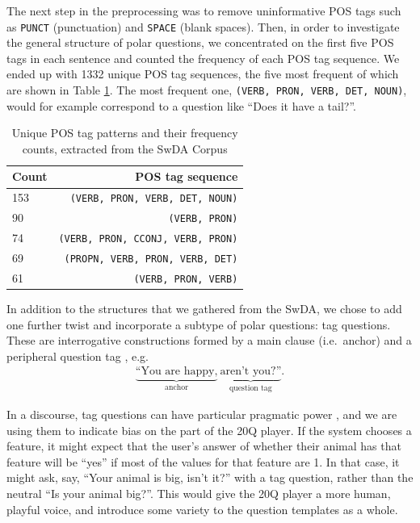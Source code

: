 \documentclass[11pt,a4paper]{article}
\begin{document}
The next step in the preprocessing was to remove uninformative POS tags such as \texttt{PUNCT} (punctuation) and \texttt{SPACE} (blank spaces).
Then, in order to investigate the general structure of polar questions, we concentrated on the first five POS tags in each sentence and counted the frequency of each POS tag sequence.
We ended up with 1332 unique POS tag sequences, the five most frequent of which are shown in Table \ref{tab:pos_patterns}.
The most frequent one, \texttt{(VERB, PRON, VERB, DET, NOUN)}, would for example correspond to a question like ``Does it have a tail?''.

\begin{table}
\centering
{\small
\begin{tabular}{lr}
	\toprule
	Count & POS tag sequence \\ \midrule
    153 & \texttt{(VERB, PRON, VERB, DET, NOUN)}\\
	90 & \texttt{(VERB, PRON)}\\
	74 & \texttt{(VERB, PRON, CCONJ, VERB, PRON)}\\
	69 & \texttt{(PROPN, VERB, PRON, VERB, DET)}\\
	61 & \texttt{(VERB, PRON, VERB)}\\
	\bottomrule
\end{tabular}
}
\caption{Unique POS tag patterns and their frequency counts, extracted from the SwDA Corpus}
\label{tab:pos_patterns}
\end{table}

In addition to the structures that we gathered from the SwDA, we chose to add one further twist and incorporate a subtype of polar questions: tag questions.
These are interrogative constructions formed by a main clause (i.e.\ anchor) and a peripheral question tag \citep{Bawden2017, Bonsignori2007, TottieEa2006}, e.g. 
\begin{gather*}
    \underbrace{\text{``You are happy,}}_{\text{anchor}}\ \underbrace{\text{aren't you?''}}_{\text{question tag}}. 
\end{gather*}

In a discourse, tag questions can have particular pragmatic power \citep{TottieEa2006}, and we are using them to indicate bias on the part of the 20Q player.
If the system chooses a feature, it might expect that the user's answer of whether their animal has that feature will be ``yes'' if most of the values for that feature are 1.
In that case, it might ask, say, ``Your animal is big, isn't it?'' with a tag question, rather than the neutral ``Is your animal big?''.
This would give the 20Q player a more human, playful voice, and introduce some variety to the question templates as a whole.
\end{document}
